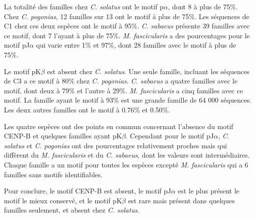 \documentclass[12pt,a4paper]{article}
\begin{document}
		La totalité des familles chez \textit{C. solatus} ont le motif  p$\alpha$, dont 8 à plus de 75\%. Chez \textit{C. pogonias}, 12 familles sur 13 ont le motif à plus de 75\%. Les séquences de C1 chez ces deux espèces ont le motif à 95\%. \textit{C. sabaeus} présente 39 familles avec ce motif, dont 7 l'ayant à plus de 75\%. \textit{M. fascicularis} a des pourcentages pour le motif pJ$\alpha$ qui varie entre 1\% et 97\%, dont 28 familles avec le motif à plus de 75\%.
		
			Le motif pK$\beta$ est absent chez \textit{C. solatus}. Une seule famille, incluant les séquences de C3 a ce motif à 80\% chez \textit{C. pogonias}. \textit{C. sabaeus} a quatre familles avec le motif, dont deux à 79\% et l'autre à 29\%. \textit{M. fascicularis} a cinq familles avec ce motif. La famille ayant le motif à 93\% est une grande famille de 64 000 séquences. Les deux autres familles ont le motif à 0.76\% et 0.50\%.
			
			Les quatre espèces ont des points en commun concernant l'absence du motif CENP-B et quelques familles ayant pK$\beta$. Cependant pour le motif pJ$\alpha$, \textit{C. solatus} et \textit{C. pogonias} ont des pourcentages relativement proches mais qui diffèrent du \textit{M. fascicularis} et du \textit{C. sabaeus}, dont les valeurs sont intermédiaires. Chaque famille a un motif pour toutes les espèces excepté \textit{M. fascicularis} qui a 6 familles sans motifs identifiables.
			
			Pour conclure, le motif CENP-B est absent, le motif pJ$\alpha$ est le plus présent le motif le mieux conservé, et le motif pK$\beta$ est rare mais présent dans quelques familles seulement, et absent chez \textit{C. solatus}.
				
\end{document}
